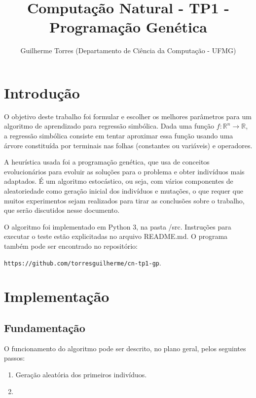 \documentclass[11pt]{article}
\begin{document}
\title{Computação Natural - TP1 - Programação Genética}
\author{Guilherme Torres (Departamento de Ciência da Computação - UFMG)}
\date{}
\maketitle

\section{Introdução}

O objetivo deste trabalho foi formular e escolher os melhores parâmetros para um algoritmo de aprendizado para regressão simbólica. Dada uma função $f: \mathbb{R}^n \to \mathbb{R}$, a regressão simbólica consiste em tentar aproximar essa função usando uma árvore constituída por terminais nas folhas (constantes ou variáveis) e operadores.
	
A heurística usada foi a programação genética, que usa de conceitos evolucionários para evoluir as soluções para o problema e obter indivíduos mais adaptados. É um algoritmo estocástico, ou seja, com vários componentes de aleatoriedade como geração inicial dos indivíduos e mutações, o que requer que muitos experimentos sejam realizados para tirar as conclusões sobre o trabalho, que serão discutidos nesse documento.

O algoritmo foi implementado em Python 3, na pasta /src. Instruções para executar o teste estão explicitadas no arquivo README.md. O programa também pode ser encontrado no repositório:

\texttt{https://github.com/torresguilherme/cn-tp1-gp}.

\section{Implementação}

\subsection{Fundamentação}

O funcionamento do algoritmo pode ser descrito, no plano geral, pelos seguintes passos:

\begin{enumerate}

\item Geração aleatória dos primeiros indivíduos.

\item 

\end{enumerate}
\end{document}
